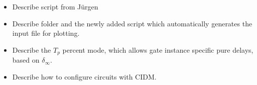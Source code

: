 \begin{itemize}
	\item Describe  script from J\"urgen
	\item Describe  folder and the newly added script  which automatically generates the input file for plotting.
	\item Describe the $T_p$ percent mode, which allows gate instance specific 
	pure delays, based on $\delta_\infty$.
	\item Describe how to configure circuits with CIDM.
\end{itemize}